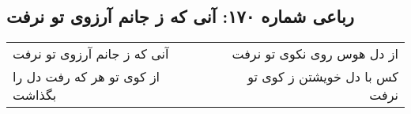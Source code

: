 \begin{center}
\section*{رباعی شماره ۱۷۰: آنی که ز جانم آرزوی تو نرفت}
\label{sec:sh170}
\begin{longtable}{l p{0.5cm} r}
آنی که ز جانم آرزوی تو نرفت
&&
از دل هوس روی نکوی تو نرفت
\\
از کوی تو هر که رفت دل را بگذاشت
&&
کس با دل خویشتن ز کوی تو نرفت
\\
\end{longtable}
\end{center}
